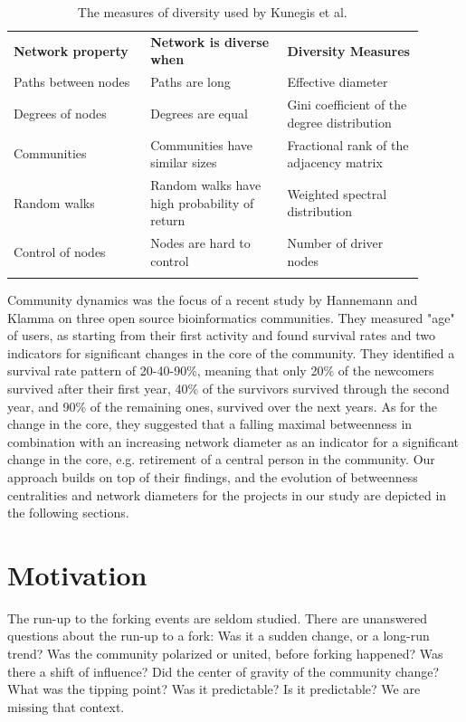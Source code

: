 \documentclass{acm_proc_article-sp}
\begin{document}
\begin{table}[!htbp]
\centering
\caption{The measures of diversity used by Kunegis et al. \cite{Kunegis}}
\label{TableDiversityMeasuresKunegisEtAl}
\begin{tabular}{p{0.3\linewidth} p{0.3\linewidth} p{0.3\linewidth}}
\hline\noalign{\smallskip}
\textbf{Network property} & \textbf{Network is diverse when} & \textbf{Diversity Measures} \\
\noalign{\smallskip}\hline\noalign{\smallskip}
Paths between nodes & Paths are long & Effective diameter \\ \hline
Degrees of nodes  & Degrees are equal & Gini coefficient of the degree distribution \\ \hline
Communities  & Communities have similar sizes & Fractional rank of the adjacency matrix \\ \hline
Random walks  & Random walks have high probability of return & Weighted spectral distribution \\ \hline
Control of nodes  & Nodes are hard to control & Number of driver nodes \\
\noalign{\smallskip}\hline
\end{tabular}
\end{table}

Community dynamics was the focus of a recent study by Hannemann and Klamma \cite{Hannemann} on three open source bioinformatics communities. They measured "age" of users, as starting from their first activity and found survival rates and two indicators for significant changes in the core of the community. They identified a survival rate pattern of 20-40-90\%, meaning that only 20\% of the newcomers survived after their first year, 40\% of the survivors survived through the second year, and 90\% of the remaining ones, survived over the next years. As for the change in the core, they suggested that a falling maximal betweenness in combination with an increasing network diameter as an indicator for a significant change in the core, e.g. retirement of a central person in the community. Our approach builds on top of their findings, and the evolution of betweenness centralities and network diameters for the projects in our study are depicted in the following sections.

\section{Motivation}
\label{motivation}
The run-up to the forking events are seldom studied. There are unanswered questions about the run-up to a fork: Was it a sudden change, or a long-run trend? Was the community polarized or united, before forking happened? Was there a shift of influence? Did the center of gravity of the community change? What was the tipping point? Was it predictable? Is it predictable? We are missing that context. 
\end{document}

